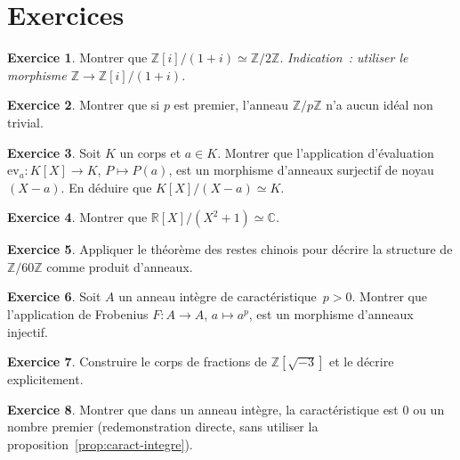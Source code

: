 \documentclass[12pt,a4paper,openany]{book}
\theoremstyle{definition}
\newtheorem{exercice}{Exercice}[chapter]
\newcommand{\Z}{\mathbb{Z}}
\newcommand{\R}{\mathbb{R}}
\newcommand{\C}{\mathbb{C}}
\begin{document}
\section{Exercices}\label{sec:exo-quotients}

\begin{exercice}\label{exo:quot-1}
Montrer que $\Z[i]/(1+i) \simeq \Z/2\Z$.
\emph{Indication~: utiliser le morphisme $\Z \to \Z[i]/(1+i)$.}
\end{exercice}

\begin{exercice}\label{exo:quot-2}
Montrer que si $p$ est premier, l'anneau $\Z/p\Z$ n'a aucun idéal non
trivial.
\end{exercice}

\begin{exercice}\label{exo:quot-3}
Soit $K$ un corps et $a \in K$. Montrer que l'application d'évaluation
$\mathrm{ev}_a \colon K[X] \to K$, $P \mapsto P(a)$, est un morphisme
d'anneaux surjectif de noyau $(X - a)$. En déduire que
$K[X]/(X-a) \simeq K$.
\end{exercice}

\begin{exercice}\label{exo:quot-4}
Montrer que $\R[X]/(X^2 + 1) \simeq \C$.
\end{exercice}

\begin{exercice}\label{exo:quot-5}
Appliquer le théorème des restes chinois pour décrire la structure de
$\Z/60\Z$ comme produit d'anneaux.
\end{exercice}

\begin{exercice}\label{exo:quot-6}
Soit $A$ un anneau intègre de caractéristique~$p > 0$. Montrer que
l'application de Frobenius
$F \colon A \to A$, $a \mapsto a^p$, est un morphisme d'anneaux
injectif.
\end{exercice}

\begin{exercice}\label{exo:quot-7}
Construire le corps de fractions de $\Z[\sqrt{-3}]$ et le décrire
explicitement.
\end{exercice}

\begin{exercice}\label{exo:quot-8}
Montrer que dans un anneau intègre, la caractéristique est $0$ ou un
nombre premier (redemonstration directe, sans utiliser la
proposition~\ref{prop:caract-integre}).
\end{exercice}
\end{document}
